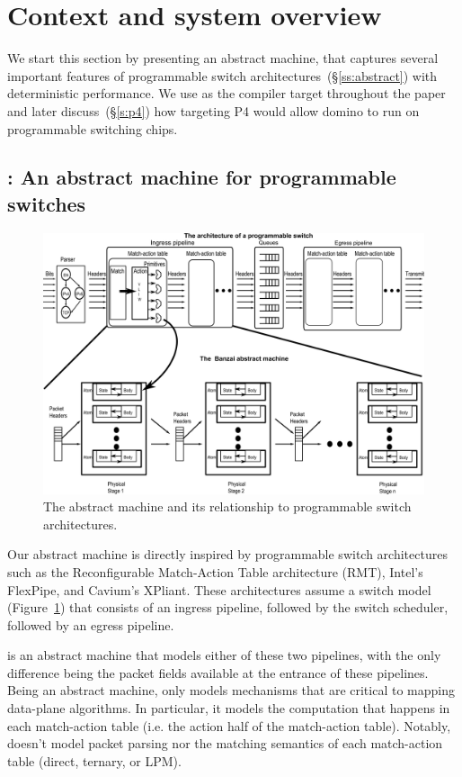 \section{Context and system overview}

We start this section by presenting an abstract machine, \textit{\absmachine} that
captures several important features of programmable switch
architectures~(\S\ref{ss:abstract}) with deterministic performance. We use
\absmachine as the compiler target throughout the paper and later
discuss~(\S\ref{s:p4}) how targeting P4 would allow domino to run on
programmable switching chips.

\subsection{\absmachine: An abstract machine for programmable switches}
\begin{figure}[!t]
  \includegraphics[width=\textwidth]{banzai.pdf}
  \caption{The \absmachine abstract machine and its relationship to programmable switch architectures.}
  \label{fig:switch}
\end{figure}
Our abstract machine is directly inspired by programmable switch architectures
such as the Reconfigurable Match-Action Table architecture (RMT), Intel's
FlexPipe, and Cavium's XPliant. These architectures assume a switch model
(Figure~\ref{fig:switch}) that consists of an ingress pipeline, followed by the
switch scheduler, followed by an egress pipeline.

\absmachine is an abstract machine that models either of these two pipelines, with
the only difference being the packet fields available at the entrance of these
pipelines. Being an abstract machine, \absmachine only models mechanisms that are
critical to mapping data-plane algorithms. In particular, it models the
computation that happens in each match-action table (i.e. the action half of
the match-action table). Notably, \absmachine doesn't model packet parsing nor the
matching semantics of each match-action table (direct, ternary, or LPM).

